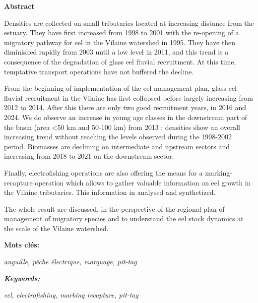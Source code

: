 \documentclass[10pt,twocolumn,titlepage,twoside]{article}\usepackage[]{graphicx}\usepackage[]{xcolor}
\begin{document}
\begin{tcolorbox}
   \vspace{8mm}
    
   \textbf{Abstract}\par
   
    \vspace{8mm}
    
\begin{itshape}
  Densities are collected on small tributaries located at increasing distance
  from the estuary. They have first increased from 1998 to 2001  with the re-opening of a
  migratory pathway for eel in the Vilaine watershed in 1995. They have then
  diminished rapidly from 2003 until a low level in 2011, and
  this trend is a consequence of the degradation of glass eel fluvial
  recruitment. At this
  time, temptative transport operations have not buffered the decline.
  
  From the beginning of implementation of the eel management plan, glass eel
  fluvial recruitment in the Vilaine has first collapsed before largely
  increasing from 2012 to 2014. After this there are only two good recruitment
  years, in 2016 and 2024.
  We do observe an increase in young age classes in the downstream part of the
  basin (area <50 km and 50-100 km) from 2013 : densities show an overall increasing trend
  without reaching the levels observed during the 1998-2002 period. Biomasses are declining on
  intermediate and upstream sectors and increasing from 2018 to 2021 on
  the downstream sector. 
    
  Finally, electrofishing operations are also offering the means for a
  marking-recapture operation which allows to gather valuable information on
 eel growth in the Vilaine tributaries. This information in analysed and
 synthetized. 
 
 The whole result are discussed, in the perspective of the regional plan of
 management of migratory species and to understand the eel stock dynamics at the
 scale of the Vilaine watershed.
\end{itshape}




    \vspace{8mm}
    \textbf{Mots clés:}\par
     \textit{anguille, pêche électrique, marquage, pit-tag}\par 
    \vspace{8mm}    
     \textbf{\textit{Keywords:}}\par
     \textit{eel, electrofishing, marking recapture, pit-tag}  
\end{tcolorbox}
\end{document}
